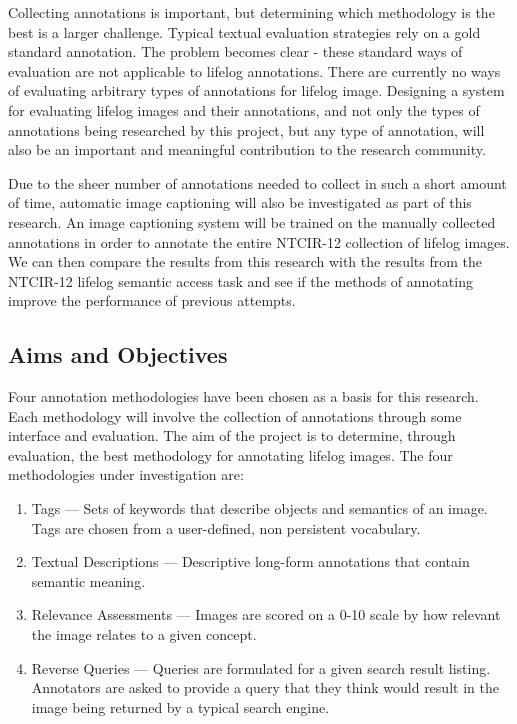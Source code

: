 Collecting annotations is important, but determining which methodology is the best is a larger challenge. Typical textual evaluation strategies rely on a gold standard annotation. The problem becomes clear - these standard ways of evaluation are not applicable to lifelog annotations. There are currently no ways of evaluating arbitrary types of annotations for lifelog image. Designing a system for evaluating lifelog images and their annotations, and not only the types of annotations being researched by this project, but any type of annotation, will also be an important and meaningful contribution to the research community. 

Due to the sheer number of annotations needed to collect in such a short amount of time, automatic image captioning will also be investigated as part of this research. An image captioning system will be trained on the manually collected annotations in order to annotate the entire NTCIR-12 collection of lifelog images. We can then compare the results from this research with the results from the NTCIR-12 lifelog semantic access task and see if the methods of annotating improve the performance of previous attempts.

\subsection{Aims and Objectives}

Four annotation methodologies have been chosen as a basis for this research. Each methodology will involve the collection of annotations through some interface and evaluation. The aim of the project is to determine, through evaluation, the best methodology for annotating lifelog images. The four methodologies under investigation are: 

\begin{enumerate}
    \item Tags --- Sets of keywords that describe objects and semantics of an image. Tags are chosen from a user-defined, non persistent vocabulary.
    \item Textual Descriptions --- Descriptive long-form annotations that contain semantic meaning.
    \item Relevance Assessments --- Images are scored on a 0-10 scale by how relevant the image relates to a given concept.
    \item Reverse Queries --- Queries are formulated for a given search result listing. Annotators are asked to provide a query that they think would result in the image being returned by a typical search engine.
\end{enumerate}

